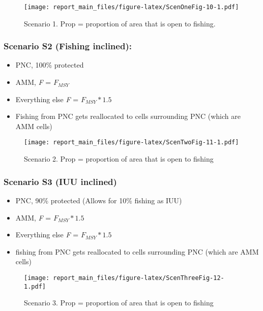 \documentclass[
]{article}
\providecommand{\tightlist}{%
  \setlength{\itemsep}{0pt}\setlength{\parskip}{0pt}}
\begin{document}
\begin{figure}
\centering
\texttt{[image: report\_main\_files/figure-latex/ScenOneFig-10-1.pdf]}
\caption{\label{fig:ScenOneFig-10}Scenario 1. Prop = proportion of area that is open to fishing.}
\end{figure}

\hypertarget{scenario-s2-fishing-inclined-1}{%
\subsubsection{Scenario S2 (Fishing inclined):}\label{scenario-s2-fishing-inclined-1}}

\begin{itemize}
\tightlist
\item
  PNC, 100\% protected
\item
  AMM, \emph{F} = \(F_{MSY}\)
\item
  Everything else \emph{F} = \(F_{MSY}*1.5\)
\item
  Fishing from PNC gets reallocated to cells surrounding PNC (which are AMM cells)
\end{itemize}

\begin{figure}
\centering
\texttt{[image: report\_main\_files/figure-latex/ScenTwoFig-11-1.pdf]}
\caption{\label{fig:ScenTwoFig-11}Scenario 2. Prop = proportion of area that is open to fishing}
\end{figure}

\hypertarget{scenario-s3-iuu-inclined-1}{%
\subsubsection{Scenario S3 (IUU inclined)}\label{scenario-s3-iuu-inclined-1}}

\begin{itemize}
\tightlist
\item
  PNC, 90\% protected (Allows for 10\% fishing as IUU)
\item
  AMM, \emph{F} = \(F_{MSY}*1.5\)
\item
  Everything else \emph{F} = \(F_{MSY}*1.5\)
\item
  fishing from PNC gets reallocated to cells surrounding PNC (which are AMM cells)
\end{itemize}

\begin{figure}
\centering
\texttt{[image: report\_main\_files/figure-latex/ScenThreeFig-12-1.pdf]}
\caption{\label{fig:ScenThreeFig-12}Scenario 3. Prop = proportion of area that is open to fishing}
\end{figure}
\end{document}
